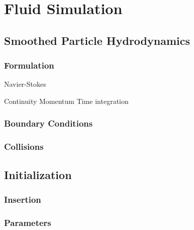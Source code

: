 \chapter{Fluid Simulation}

\section{Smoothed Particle Hydrodynamics}

\subsection{Formulation}

Navier-Stokes

Continuity
Momentum
Time integration

\subsection{Boundary Conditions}
\subsection{Collisions}


\section{Initialization}
\subsection{Insertion}
\subsection{Parameters}



